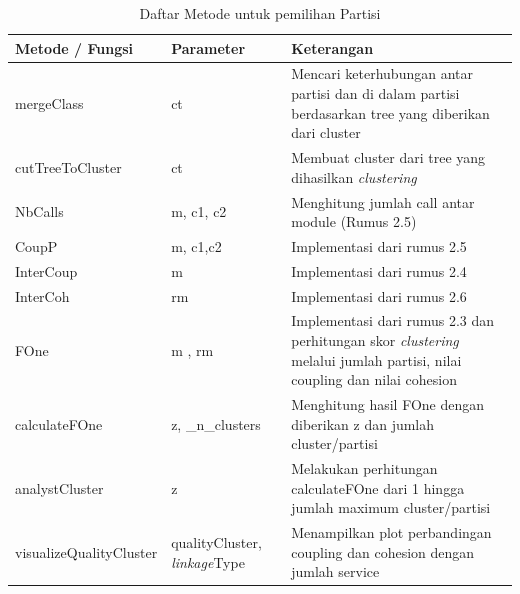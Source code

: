 \begingroup
\setlength{\LTleft}{-20cm plus -1fill}
\setlength{\LTright}{\LTleft}
\begin{small}
	\begin{longtable}{|p{4cm}|p{3cm}|p{6cm}|}
		\caption{Daftar Metode untuk pemilihan Partisi}\\
		\hline
		\textbf{Metode / Fungsi} & \textbf{Parameter} & \textbf{Keterangan}\\
		\endfirsthead
		
		\hline  

		mergeClass
		& ct
		 &  Mencari keterhubungan antar partisi dan di dalam partisi berdasarkan tree yang diberikan dari cluster \\

		 \hline  

		 cutTreeToCluster
		& ct
		 & Membuat cluster dari tree yang dihasilkan \textit{clustering}  \\

		 \hline  

		 NbCalls
		& m, c1, c2
		 & Menghitung jumlah call antar module (Rumus 2.5) \\

		 \hline  
		 CoupP
		 
		& m, c1,c2
		 & Implementasi dari rumus 2.5   \\

		 \hline  

		 InterCoup
		& m
		 & Implementasi dari rumus 2.4 \\

		 \hline
		
		 InterCoh
		& rm
		 & Implementasi dari rumus 2.6  \\

		 \hline
		 
		 FOne
		& m , rm
		 & Implementasi dari rumus 2.3 dan perhitungan skor \textit{clustering} melalui jumlah partisi, nilai coupling dan nilai cohesion \\

		 \hline
		 calculateFOne
		& z, {\_}n{\_}clusters
		 & Menghitung hasil FOne dengan diberikan z dan jumlah cluster/partisi \\

		 \hline
		 analystCluster
		& z
		 & Melakukan perhitungan calculateFOne dari 1 hingga jumlah maximum cluster/partisi \\ 


		 \hline
		 visualizeQualityCluster
		& qualityCluster, \textit{linkage}Type
		 & Menampilkan plot perbandingan coupling dan cohesion dengan jumlah service  \\

		 \hline
	\end{longtable}
\end{small}
\endgroup

